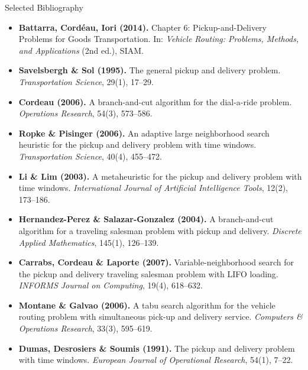 \documentclass[aspectratio=169,10pt]{beamer}
\begin{document}
\begin{frame}[allowframebreaks]{Selected Bibliography}
  \footnotesize
  \begin{itemize}
    \item \textbf{Battarra, Cord\'{e}au, Iori (2014).} Chapter 6: Pickup-and-Delivery
          Problems for Goods Transportation. In: \textit{Vehicle Routing: Problems,
          Methods, and Applications} (2nd ed.), SIAM.

    \item \textbf{Savelsbergh \& Sol (1995).} The general pickup and delivery problem.
          \textit{Transportation Science}, 29(1), 17--29.

    \item \textbf{Cordeau (2006).} A branch-and-cut algorithm for the dial-a-ride problem.
          \textit{Operations Research}, 54(3), 573--586.

    \item \textbf{Ropke \& Pisinger (2006).} An adaptive large neighborhood search
          heuristic for the pickup and delivery problem with time windows.
          \textit{Transportation Science}, 40(4), 455--472.

    \item \textbf{Li \& Lim (2003).} A metaheuristic for the pickup and delivery problem
          with time windows. \textit{International Journal of Artificial Intelligence
          Tools}, 12(2), 173--186.

    \item \textbf{Hernandez-Perez \& Salazar-Gonzalez (2004).} A branch-and-cut algorithm
          for a traveling salesman problem with pickup and delivery.
          \textit{Discrete Applied Mathematics}, 145(1), 126--139.

    \item \textbf{Carrabs, Cordeau \& Laporte (2007).} Variable-neighborhood search
          for the pickup and delivery traveling salesman problem with LIFO loading.
          \textit{INFORMS Journal on Computing}, 19(4), 618--632.

    \item \textbf{Montane \& Galvao (2006).} A tabu search algorithm for the vehicle
          routing problem with simultaneous pick-up and delivery service.
          \textit{Computers \& Operations Research}, 33(3), 595--619.

    \item \textbf{Dumas, Desrosiers \& Soumis (1991).} The pickup and delivery problem
          with time windows. \textit{European Journal of Operational Research},
          54(1), 7--22.


\end{itemize}
\end{frame}
\end{document}
